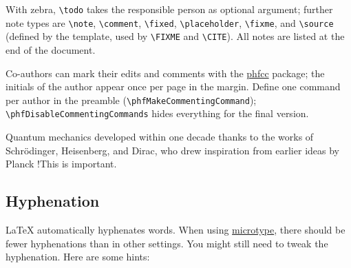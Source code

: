 With zebra, \verb|\todo| takes the responsible person as optional argument; further note types are \verb|\note|, \verb|\comment|, \verb|\fixed|, \verb|\placeholder|, \verb|\fixme|, and \verb|\source| (defined by the template, used by \verb|\FIXME| and \verb|\CITE|).
All notes are listed at the end of the document.

\begin{ltgexample}




\end{ltgexample}


Co-authors can mark their edits and comments with the \href{https://ctan.org/pkg/phfcc}{phfcc} package; the initials of the author appear once per page in the margin.
Define one command per author in the preamble (\verb|\phfMakeCommentingCommand|); \verb|\phfDisableCommentingCommands| hides everything for the final version.

\begin{ltgexample}
Quantum mechanics developed within one decade thanks to the works of Schrödinger, Heisenberg, and Dirac,
who drew inspiration from earlier ideas by Planck  
 \FA!{This is important.}
\end{ltgexample}

\subsection{Hyphenation}

\LaTeX{} automatically hyphenates words.
When using \href{https://ctan.org/pkg/microtype}{microtype}, there should be fewer hyphenations than in other settings.
You might still need to tweak the hyphenation.
Here are some hints:


